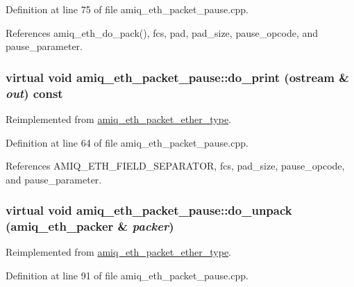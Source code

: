 Definition at line 75 of file amiq\_\-eth\_\-packet\_\-pause.cpp.

References amiq\_\-eth\_\-do\_\-pack(), fcs, pad, pad\_\-size, pause\_\-opcode, and pause\_\-parameter.\hypertarget{classamiq__eth__packet__pause_a7ea960bd9c079375b0d4cd72a762d695}{
\subsubsection[{do\_\-print}]{\setlength{\rightskip}{0pt plus 5cm}virtual void amiq\_\-eth\_\-packet\_\-pause::do\_\-print (ostream \& {\em out}) const}}
\label{classamiq__eth__packet__pause_a7ea960bd9c079375b0d4cd72a762d695}


Reimplemented from \hyperlink{classamiq__eth__packet__ether__type_a9b2852fa1aaf278138fde2232e446f63}{amiq\_\-eth\_\-packet\_\-ether\_\-type}.

Definition at line 64 of file amiq\_\-eth\_\-packet\_\-pause.cpp.

References AMIQ\_\-ETH\_\-FIELD\_\-SEPARATOR, fcs, pad\_\-size, pause\_\-opcode, and pause\_\-parameter.\hypertarget{classamiq__eth__packet__pause_aa458964a73aa61bca99cb30ffa56f54c}{
\subsubsection[{do\_\-unpack}]{\setlength{\rightskip}{0pt plus 5cm}virtual void amiq\_\-eth\_\-packet\_\-pause::do\_\-unpack ({\bf amiq\_\-eth\_\-packer} \& {\em packer})}}
\label{classamiq__eth__packet__pause_aa458964a73aa61bca99cb30ffa56f54c}


Reimplemented from \hyperlink{classamiq__eth__packet__ether__type_a0c86ef80c46bbed384739b23e5efb0ef}{amiq\_\-eth\_\-packet\_\-ether\_\-type}.

Definition at line 91 of file amiq\_\-eth\_\-packet\_\-pause.cpp.

